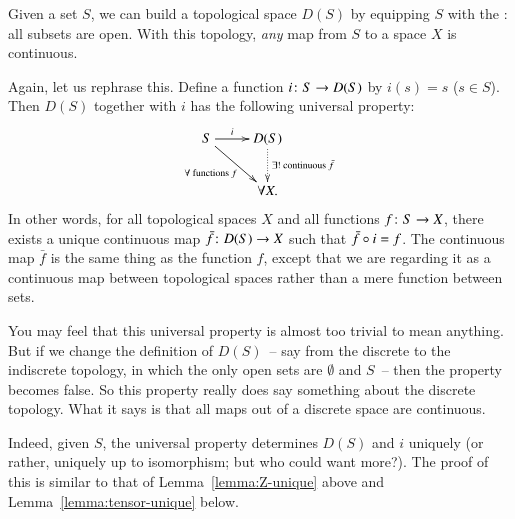 \begin{iexample}
\label{eg:univ-discrete}
Given a set $S$, we can build a topological space $D(S)$%
%
%
by equipping $S$ with the : all subsets are open.  With this topology, \emph{any} map from
$S$ to a space $X$ is continuous.

Again, let us rephrase this.  Define a function $i\from S \to D(S)$ by
$i(s) = s$ ($s \in S$).  Then $D(S)$ together with $i$ has the following
universal property:
\[
\xymatrix{
S \ar[r]^-i \ar[dr]_{\forall \text{ functions } f}       &
D(S) \ar@{.>}[d]^{\exists! \text{ continuous } \bar{f}}   \\
&
\forall X.
}
\]
In other words, for all topological spaces $X$ and all functions $f\from S \to
X$, there exists a unique continuous map $\bar{f}\from D(S) \to X$ such that
$\bar{f} \mathbin{\circ} i = f$.  The continuous map $\bar{f}$ is the same thing as the
function $f$, except that we are regarding it as a continuous map between
topological spaces rather than a mere function between sets.

You may feel that this universal property is almost too trivial to mean
anything.  But if we change the definition of $D(S)$~-- say from the
discrete to the indiscrete topology, in which the only open sets are
$\emptyset$ and $S$~-- then the property becomes false.  So this property
really does say something about the discrete topology.  What it says is
that all maps out of a discrete space are continuous.

Indeed, given $S$, the universal property determines $D(S)$ and $i$
uniquely (or rather, uniquely up to isomorphism; but who could want more?).
The proof of this is similar to that of Lemma~\ref{lemma:Z-unique} above
and Lemma~\ref{lemma:tensor-unique} below.
\end{iexample}


